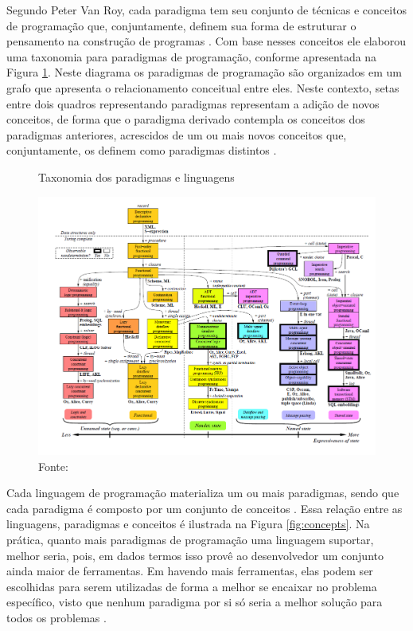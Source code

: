 Segundo Peter Van Roy, cada paradigma tem seu conjunto de técnicas e conceitos
de programação que, conjuntamente, definem sua forma de estruturar o pensamento
na construção de programas \cite{van_roy_2012}. Com base nesses conceitos ele
elaborou uma taxonomia para paradigmas de programação, conforme apresentada na
Figura \ref{fig:paradigmas_roy}. Neste diagrama os paradigmas de programação são
organizados em um grafo que apresenta o relacionamento conceitual entre eles.
Neste contexto, setas entre dois quadros representando paradigmas representam a
adição de novos conceitos, de forma que o paradigma derivado contempla os
conceitos dos paradigmas anteriores, acrescidos de um ou mais novos conceitos
que, conjuntamente, os definem como paradigmas distintos \cite{van_roy_2012}.

\begin{figure}[!htb]
  \centering
  \caption{Taxonomia dos paradigmas e linguagens}
  \includegraphics[width=\textwidth, height=0.46\textheight]{../figures/taxonomia.png}
  \caption*{Fonte: }
  \label{fig:paradigmas_roy}
\end{figure}

Cada linguagem de programação materializa um ou mais paradigmas, sendo que cada
paradigma é composto por um conjunto de conceitos \cite{van_roy_2012}. Essa
relação entre as linguagens, paradigmas e conceitos é ilustrada na Figura
\ref{fig:concepts}. Na prática, quanto mais paradigmas de programação uma
linguagem suportar, melhor seria, pois, em dados termos isso provê ao
desenvolvedor um conjunto ainda maior de ferramentas. Em havendo mais
ferramentas, elas podem ser escolhidas para serem utilizadas de forma a melhor
se encaixar no problema específico, visto que nenhum paradigma por si só seria a
melhor solução para todos os problemas \cite{van_roy_2004}.

